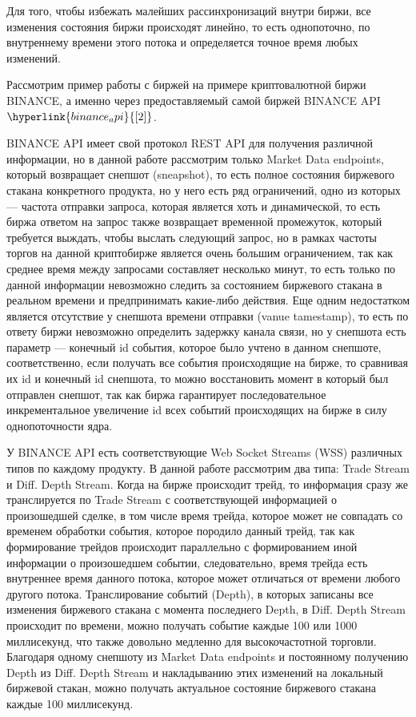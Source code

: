 \documentclass[12pt, a4paper]{article}
\begin{document}
Для того, чтобы избежать малейших рассинхронизаций внутри биржи, все изменения состояния биржи происходят линейно, то есть однопоточно, по внутреннему времени этого потока и определяется точное время любых изменений.

Рассмотрим пример работы с биржей на примере криптовалютной биржи BINANCE, а именно через предоставляемый самой биржей BINANCE API $\hyperlink{binance_api}{[2]}$. 

BINANCE API имеет свой протокол REST API для получения различной информации, но в данной работе рассмотрим только Market Data endpoints, который возвращает снепшот (sneapshot), то есть полное состояния биржевого стакана конкретного продукта, но у него есть ряд ограничений, одно из которых --- частота отправки запроса, которая является хоть и динамической, то есть биржа ответом на запрос также возвращает временной промежуток, который требуется выждать, чтобы выслать следующий запрос, но в рамках частоты торгов на данной криптобирже является очень большим ограничением, так как среднее время между запросами составляет несколько минут, то есть только по данной информации невозможно следить за состоянием биржевого стакана в реальном времени и предпринимать какие-либо действия. Еще одним недостатком является отсутствие у снепшота времени отправки (vanue tamestamp), то есть по ответу биржи невозможно определить задержку канала связи, но у снепшота есть параметр --- конечный id события, которое было учтено в данном снепшоте, соответственно, если получать все события происходящие на бирже, то сравнивая их id и конечный id снепшота, то можно восстановить момент в который был отправлен снепшот, так как биржа гарантирует последовательное инкрементальное увеличение id всех событий происходящих на бирже в силу однопоточности ядра.

У BINANCE API есть соответствующие Web Socket Streams (WSS) различных типов по каждому продукту. В данной работе рассмотрим два типа: Trade Stream и Diff. Depth Stream. Когда на бирже происходит трейд, то информация сразу же транслируется по Trade Stream с соответствующей информацией о произошедшей сделке, в том числе время трейда, которое может не совпадать со временем обработки события, которое породило данный трейд, так как формирование трейдов происходит параллельно с формированием иной информации о произошедшем событии, следовательно, время трейда есть внутреннее время данного потока, которое может отличаться от времени любого другого потока. Транслирование событий (Depth), в которых записаны все изменения биржевого стакана с момента последнего Depth, в Diff. Depth Stream происходит по времени, можно получать событие каждые 100 или 1000 миллисекунд, что также довольно медленно для высокочастотной торговли. Благодаря одному снепшоту из Market Data endpoints и постоянному получению Depth из Diff. Depth Stream и накладыванию этих изменений на локальный биржевой стакан, можно получать актуальное состояние биржевого стакана каждые 100 миллисекунд. 
\end{document}
